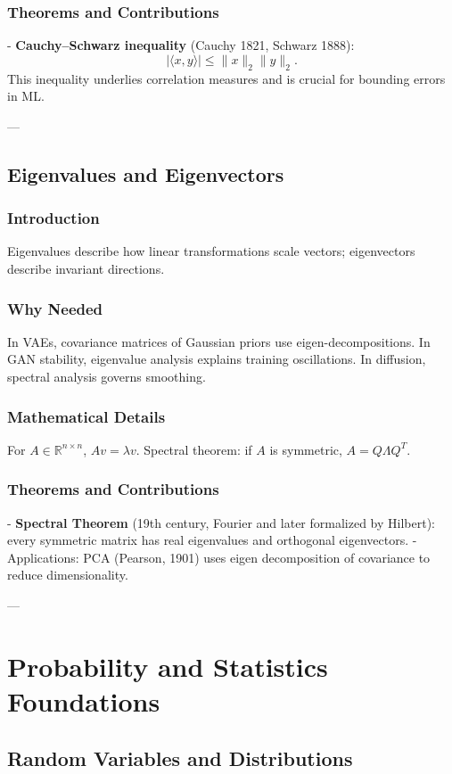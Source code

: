\documentclass[11pt]{book}
\begin{document}
\subsection{Theorems and Contributions}
- \textbf{Cauchy–Schwarz inequality} (Cauchy 1821, Schwarz 1888):
\[
|\langle x, y \rangle| \leq \|x\|_2 \|y\|_2.
\]
This inequality underlies correlation measures and is crucial for bounding errors in ML.

---

\section{Eigenvalues and Eigenvectors}
\subsection{Introduction}
Eigenvalues describe how linear transformations scale vectors; eigenvectors describe invariant directions.

\subsection{Why Needed}
In VAEs, covariance matrices of Gaussian priors use eigen-decompositions. In GAN stability, eigenvalue analysis explains training oscillations. In diffusion, spectral analysis governs smoothing.

\subsection{Mathematical Details}
For $A \in \mathbb{R}^{n\times n}$, $Av = \lambda v$.  
Spectral theorem: if $A$ is symmetric, $A = Q \Lambda Q^T$.

\subsection{Theorems and Contributions}
- \textbf{Spectral Theorem} (19th century, Fourier and later formalized by Hilbert): every symmetric matrix has real eigenvalues and orthogonal eigenvectors.  
- Applications: PCA (Pearson, 1901) uses eigen decomposition of covariance to reduce dimensionality.

---

\chapter{Probability and Statistics Foundations}

\section{Random Variables and Distributions}
\end{document}
